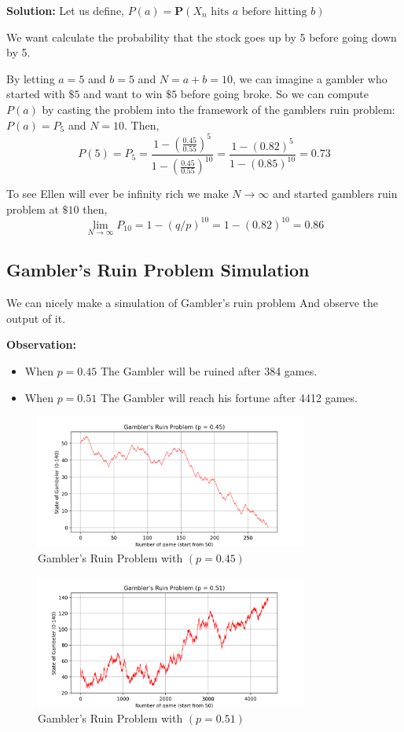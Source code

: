 \textbf{Solution: } Let us define,
$ P(a) = \mathbf{P}\left(X_{n} \text{ hits }a \text{ before hitting } b\right)$ 

We want calculate the probability that the stock goes up by 5 before going down by 5.

By letting $ a=5 $ and $ b=5 $ and $ N=a+b=10 $, we can imagine a gambler who started with $ \$5 $ and want to win $ \$5 $
before going broke. So we can compute $P(a)$ by casting the problem into the framework of the gamblers ruin problem: 
$ P(a) = P_{5} $ and $ N=10 $. Then,
\[
    P(5) = P_{5} = \frac{1-\left(\frac{0.45}{0.55}\right)^{5}}{1-\left(\frac{0.45}{0.55}\right)^{10}} = \frac{1-(0.82)^{5}}{1-(0.85)^{10}} = 0.73
\]

To see Ellen will ever be infinity rich we make  $ N\to\infty $ and started gamblers ruin problem at $ \$10 $ then,
\[
    \lim_{N\to\infty}P_{10} = 1 - (q/p)^{10} = 1 - (0.82)^{10} = 0.86
\]


\subsection{Gambler's Ruin Problem Simulation}
We can nicely make a simulation of Gambler's ruin problem And observe the output of it.

\textbf{Observation: }
\begin{itemize}
    \item When $ p=0.45 $ The Gambler will be ruined after 384 games.
    \item When $ p=0.51 $ The Gambler will reach his fortune after 4412 games.
\end{itemize}


\begin{figure}[H]
    \centering
    \includegraphics[width=0.8\textwidth]{pic/GR0.45.png}
    \caption{Gambler's Ruin Problem with $( p=0.45 )$}
\end{figure}

\makeatletter
\setlength{\@fptop}{0pt}
\makeatother

\begin{figure}[H]
    \centering
    \includegraphics[width=0.8\textwidth]{pic/GR0.51.png}
    \caption{Gambler's Ruin Problem with $( p=0.51 )$}
\end{figure}

